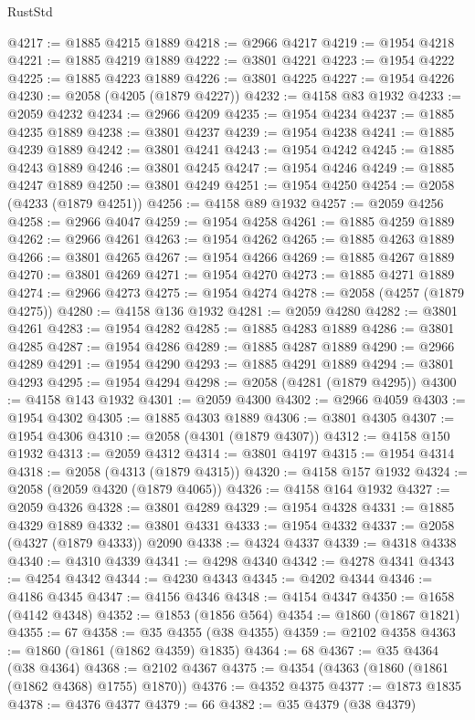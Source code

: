 \begin{lexlean}{RustStd}
\begin{coremodule}
@4217 := @1885 @4215 @1889
@4218 := @2966 @4217
@4219 := @1954 @4218
@4221 := @1885 @4219 @1889
@4222 := @3801 @4221
@4223 := @1954 @4222
@4225 := @1885 @4223 @1889
@4226 := @3801 @4225
@4227 := @1954 @4226
@4230 := @2058 (@4205 (@1879 @4227))
@4232 := @4158 @83 @1932
@4233 := @2059 @4232
@4234 := @2966 @4209
@4235 := @1954 @4234
@4237 := @1885 @4235 @1889
@4238 := @3801 @4237
@4239 := @1954 @4238
@4241 := @1885 @4239 @1889
@4242 := @3801 @4241
@4243 := @1954 @4242
@4245 := @1885 @4243 @1889
@4246 := @3801 @4245
@4247 := @1954 @4246
@4249 := @1885 @4247 @1889
@4250 := @3801 @4249
@4251 := @1954 @4250
@4254 := @2058 (@4233 (@1879 @4251))
@4256 := @4158 @89 @1932
@4257 := @2059 @4256
@4258 := @2966 @4047
@4259 := @1954 @4258
@4261 := @1885 @4259 @1889
@4262 := @2966 @4261
@4263 := @1954 @4262
@4265 := @1885 @4263 @1889
@4266 := @3801 @4265
@4267 := @1954 @4266
@4269 := @1885 @4267 @1889
@4270 := @3801 @4269
@4271 := @1954 @4270
@4273 := @1885 @4271 @1889
@4274 := @2966 @4273
@4275 := @1954 @4274
@4278 := @2058 (@4257 (@1879 @4275))
@4280 := @4158 @136 @1932
@4281 := @2059 @4280
@4282 := @3801 @4261
@4283 := @1954 @4282
@4285 := @1885 @4283 @1889
@4286 := @3801 @4285
@4287 := @1954 @4286
@4289 := @1885 @4287 @1889
@4290 := @2966 @4289
@4291 := @1954 @4290
@4293 := @1885 @4291 @1889
@4294 := @3801 @4293
@4295 := @1954 @4294
@4298 := @2058 (@4281 (@1879 @4295))
@4300 := @4158 @143 @1932
@4301 := @2059 @4300
@4302 := @2966 @4059
@4303 := @1954 @4302
@4305 := @1885 @4303 @1889
@4306 := @3801 @4305
@4307 := @1954 @4306
@4310 := @2058 (@4301 (@1879 @4307))
@4312 := @4158 @150 @1932
@4313 := @2059 @4312
@4314 := @3801 @4197
@4315 := @1954 @4314
@4318 := @2058 (@4313 (@1879 @4315))
@4320 := @4158 @157 @1932
@4324 := @2058 (@2059 @4320 (@1879 @4065))
@4326 := @4158 @164 @1932
@4327 := @2059 @4326
@4328 := @3801 @4289
@4329 := @1954 @4328
@4331 := @1885 @4329 @1889
@4332 := @3801 @4331
@4333 := @1954 @4332
@4337 := @2058 (@4327 (@1879 @4333)) @2090
@4338 := @4324 @4337
@4339 := @4318 @4338
@4340 := @4310 @4339
@4341 := @4298 @4340
@4342 := @4278 @4341
@4343 := @4254 @4342
@4344 := @4230 @4343
@4345 := @4202 @4344
@4346 := @4186 @4345
@4347 := @4156 @4346
@4348 := @4154 @4347
@4350 := @1658 (@4142 @4348)
@4352 := @1853 (@1856 @564)
@4354 := @1860 (@1867 @1821)
@4355 := 67
@4358 := @35 @4355 (@38 @4355)
@4359 := @2102 @4358
@4363 := @1860 (@1861 (@1862 @4359) @1835)
@4364 := 68
@4367 := @35 @4364 (@38 @4364)
@4368 := @2102 @4367
@4375 := @4354 (@4363 (@1860 (@1861 (@1862 @4368) @1755) @1870))
@4376 := @4352 @4375
@4377 := @1873 @1835
@4378 := @4376 @4377
@4379 := 66
@4382 := @35 @4379 (@38 @4379)

\end{coremodule}
\end{lexlean}
